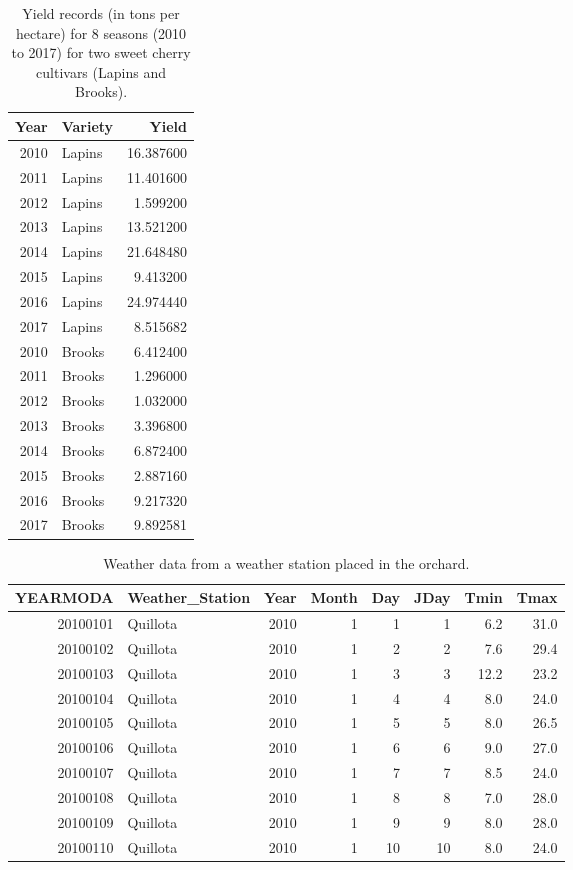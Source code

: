 \documentclass[]{article}
\begin{document}
\begin{table}

\caption{\label{tab:tables_1_3}Yield records (in tons per hectare) for 8 seasons (2010 to 2017) for two sweet cherry cultivars (Lapins and Brooks).}
\centering
\begin{tabular}[t]{r|l|r}
\hline
Year & Variety & Yield\\
\hline
2010 & Lapins & 16.387600\\
\hline
2011 & Lapins & 11.401600\\
\hline
2012 & Lapins & 1.599200\\
\hline
2013 & Lapins & 13.521200\\
\hline
2014 & Lapins & 21.648480\\
\hline
2015 & Lapins & 9.413200\\
\hline
2016 & Lapins & 24.974440\\
\hline
2017 & Lapins & 8.515682\\
\hline
2010 & Brooks & 6.412400\\
\hline
2011 & Brooks & 1.296000\\
\hline
2012 & Brooks & 1.032000\\
\hline
2013 & Brooks & 3.396800\\
\hline
2014 & Brooks & 6.872400\\
\hline
2015 & Brooks & 2.887160\\
\hline
2016 & Brooks & 9.217320\\
\hline
2017 & Brooks & 9.892581\\
\hline
\end{tabular}
\end{table}

\begin{table}

\caption{\label{tab:tables_1_3}Weather data from a weather station placed in the orchard.}
\centering
\begin{tabular}[t]{r|l|r|r|r|r|r|r}
\hline
YEARMODA & Weather\_Station & Year & Month & Day & JDay & Tmin & Tmax\\
\hline
20100101 & Quillota & 2010 & 1 & 1 & 1 & 6.2 & 31.0\\
\hline
20100102 & Quillota & 2010 & 1 & 2 & 2 & 7.6 & 29.4\\
\hline
20100103 & Quillota & 2010 & 1 & 3 & 3 & 12.2 & 23.2\\
\hline
20100104 & Quillota & 2010 & 1 & 4 & 4 & 8.0 & 24.0\\
\hline
20100105 & Quillota & 2010 & 1 & 5 & 5 & 8.0 & 26.5\\
\hline
20100106 & Quillota & 2010 & 1 & 6 & 6 & 9.0 & 27.0\\
\hline
20100107 & Quillota & 2010 & 1 & 7 & 7 & 8.5 & 24.0\\
\hline
20100108 & Quillota & 2010 & 1 & 8 & 8 & 7.0 & 28.0\\
\hline
20100109 & Quillota & 2010 & 1 & 9 & 9 & 8.0 & 28.0\\
\hline
20100110 & Quillota & 2010 & 1 & 10 & 10 & 8.0 & 24.0\\
\hline
\end{tabular}
\end{table}
\end{document}
